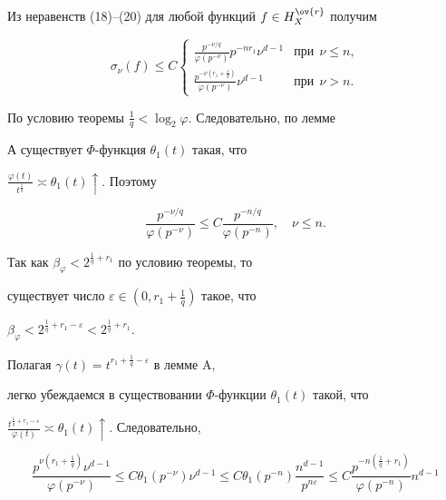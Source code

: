Из неравенств (18)--(20) для любой функций $f\in H_{X}^{\ov{r}}$ получим


\begin{equation}


\sigma_{\nu}(f)\le C


\begin{cases}


\frac{p^{-\nu/q}}{\varphi(p^{-\nu})}p^{-nr_{1}}\nu^{d-1}


& \text{при} \ \ \nu\le n, \\


\frac{p^{-\nu(r_1+\frac{1}{q})}}{\varphi(p^{-\nu})}\nu^{d-1}


& \text{при} \ \ \nu>n.


\end{cases}


\end{equation}  








По условию теоремы $\frac{1}{q}<\log_{2}\varphi$. Следовательно, по лемме


А существует $\Phi$-функция $\theta_{1}(t)$ такая, что 


$\frac{\varphi(t)}{t^{\frac{1}{q}}}\asymp\theta_{1}(t)\uparrow$. Поэтому 


\begin{equation}


\frac{p^{-\nu/q}}{\varphi(p^{-\nu})}\le C\frac{p^{-n/q}}{\varphi(p^{-n})}, 


\quad \nu\le n.  


\end{equation}   


Так как $\beta_{\varphi}<2^{\frac{1}{q}+r_{1}}$ по условию теоремы, то 


существует число $\varepsilon\in (0,r_{1}+\frac{1}{q})$  такое, что 


$\beta_{\varphi}<2^{\frac{1}{q}+r_{1}-\varepsilon}<2^{\frac{1}{q}+r_{1}}$. 


Полагая $\gamma(t)=t^{r_{1}+\frac{1}{q}-\varepsilon}$ в лемме A,  


легко убеждаемся в существовании $\Phi$-функ\-ции $\theta_{1}(t)$ такой, что 


$\frac{t^{\frac{1}{q}+r_{1}-\varepsilon}}{\varphi(t)}\asymp 


\theta_{1}(t)\uparrow$. Следовательно,


\begin{equation}


\frac{p^{\nu(r_{1}+\frac{1}{q})}\nu^{d-1}}{\varphi(p^{-\nu})}\le


C\theta_{1}(p^{-\nu})\nu^{d-1}\le C\theta_{1}(p^{-n})


\frac{n^{d-1}}{p^{n\varepsilon}}\le


C\frac{p^{-n(\frac{1}{q}+r_{1})}}{\varphi(p^{-n})}n^{d-1}


\end{equation}  


